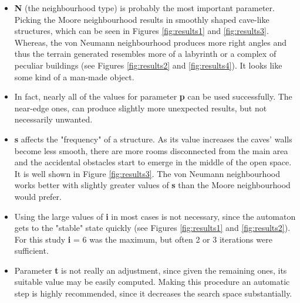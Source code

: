\documentclass[a4paper, 11pt]{article} %
\begin{document}
\begin{itemize}
        \item \textbf{N} (the neighbourhood type) is probably the most important parameter. Picking the Moore neighbourhood results in smoothly shaped cave-like structures, which can be seen in Figures \ref{fig:results1} and \ref{fig:results3}. Whereas, the von Neumann neighbourhood produces more right angles and thus the terrain generated resembles more of a labyrinth or a complex of peculiar buildings (see Figures \ref{fig:results2} and \ref{fig:results4}). It looks like some kind of a man-made object. 
	\item In fact, nearly all of the values for parameter \textbf{p} can be used successfully. The near-edge ones, can produce slightly more unexpected results, but not necessarily unwanted.
	\item \textbf{s} affects the "frequency" of a structure. As its value increases the caves' walls become less smooth, there are more rooms disconnected from the main area and the accidental obstacles start to emerge in the middle of the open space. It is well shown in Figure \ref{fig:results3}. The von Neumann neighbourhood works better with slightly greater values of \textbf{s} than the Moore neighbourhood would prefer.
	\item Using the large values of \textbf{i} in most cases is not necessary, since the automaton gets to the "stable" state quickly (see Figures \ref{fig:results1} and \ref{fig:results2}). For this study \textbf{i} = 6 was the maximum, but often 2 or 3 iterations were sufficient.
        \item Parameter \textbf{t} is not really an adjustment, since given the remaining ones, its suitable value may be easily computed. Making this procedure an automatic step is highly recommended, since it decreases the search space substantially.
\end{itemize}



\end{document}
